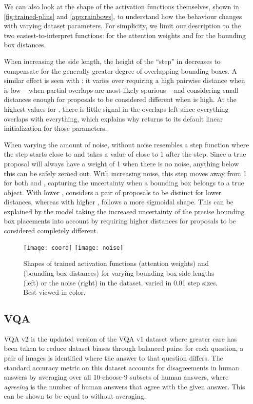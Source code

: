 \documentclass[letterpaper]{article}
\begin{document}
We can also look at the shape of the activation functions themselves, shown in \autoref{fig:trained-plins} and \autoref{app:rainbows}, to understand how the behaviour changes with varying dataset parameters.
For simplicity, we limit our description to the two easiest-to-interpret functions:  for the attention weights and  for the bounding box distances.

When increasing the side length, the height of the ``step'' in  decreases to compensate for the generally greater degree of overlapping bounding boxes.
A similar effect is seen with : it varies over requiring a high pairwise distance when  is low -- when partial overlaps are most likely spurious -- and considering small distances enough for proposals to be considered different when  is high.
At the highest values for , there is little signal in the overlaps left since everything overlaps with everything, which explains why  returns to its default linear initialization for those parameters.

When varying the amount of noise, without noise  resembles a step function where the step starts close to  and takes a value of close to 1 after the step.
Since a true proposal will always have a weight of 1 when there is no noise, anything below this can be safely zeroed out.
With increasing noise, this step moves away from 1 for both  and , capturing the uncertainty when a bounding box belongs to a true object.
With lower ,  considers a pair of proposals to be distinct for lower distances, whereas with higher ,  follows a more sigmoidal shape.
This can be explained by the model taking the increased uncertainty of the precise bounding box placements into account by requiring higher distances for proposals to be considered completely different.

\begin{figure}
    \centering
    \texttt{[image: coord]}
    \texttt{[image: noise]}
    \caption{
        Shapes of trained activation functions  (attention weights) and  (bounding box distances) for varying bounding box side lengths (left) or the noise (right) in the dataset, varied in 0.01 step sizes.
        Best viewed in color.
    }
    \label{fig:trained-plins}
\end{figure}


\subsection{VQA}
VQA v2 \citep{Goyal2017a} is the updated version of the VQA v1 dataset \citep{Agrawal2015a} where greater care has been taken to reduce dataset biases through balanced pairs:
for each question, a pair of images is identified where the answer to that question differs.
The standard accuracy metric on this dataset accounts for disagreements in human answers by averaging  over all 10-choose-9 subsets of human answers, where \emph{agreeing} is the number of human answers that agree with the given answer.
This can be shown to be equal to  without averaging.
\end{document}
